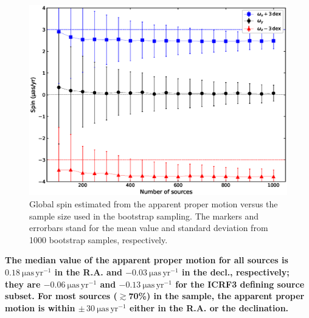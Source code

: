 \documentclass{aa}
\begin{document}
    \begin{figure}
        \label{fig:spin-dist}%
        \centering
        \includegraphics[width=\columnwidth]{figs/spin-from-apm-glo}
        \caption{
        Global spin estimated from the apparent proper motion versus the sample size used in the bootstrap sampling.
        The markers and errorbars stand for the mean value and standard deviation from 1000 bootstrap samples, respectively.
        }
    \end{figure}

    
    \textbf{
    The median value of the apparent proper motion for all sources is $\mathrm{0.18~\mu as\,yr^{-1}}$ in the R.A. and $\mathrm{-0.03~\mu as\,yr^{-1}}$ in the decl., respectively; they are $\mathrm{-0.06~\mu as\,yr^{-1}}$ and $\mathrm{-0.13~\mu as\,yr^{-1}}$ for the ICRF3 defining source subset.
    For most sources ($\gtrsim$70\%) in the sample, the apparent proper motion is within $\mathrm{\pm\,30~\mu as\,yr^{-1}}$ either in the R.A. or the declination.}
    
\end{document}
